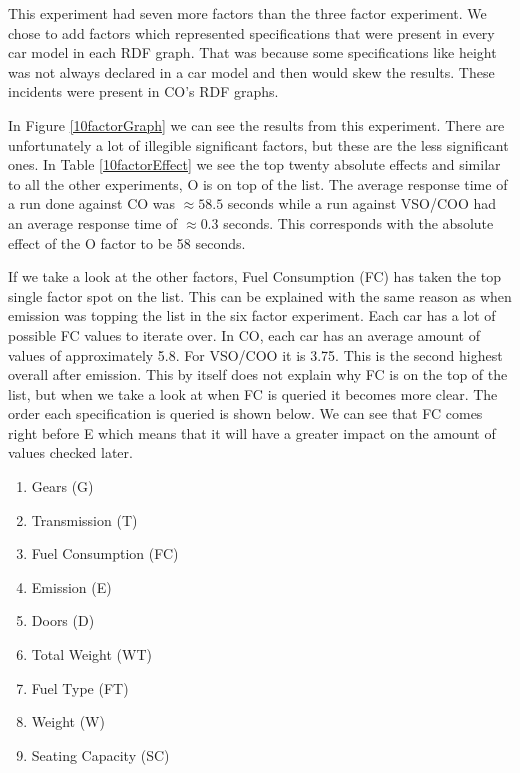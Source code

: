 \documentclass{llncs}
\begin{document}
This experiment had seven more factors than the three factor experiment.  We chose to add
factors which represented specifications that were present in every
car model in each RDF graph. That was because some specifications like
height was not always declared in a car model and then would skew the
results. These incidents were present in CO's RDF graphs.

In Figure \ref{10factorGraph} we can see the results from this
experiment. There are unfortunately a lot of illegible significant
factors, but these are the less significant ones. In Table
\ref{10factorEffect} we see the top twenty absolute effects and
similar to all the other experiments, O is on top of the list. The
average response time of a run done against CO was $\approx58.5$
seconds while a run against VSO/COO had an average response time of
$\approx0.3$ seconds.  This corresponds with the absolute effect of
the O factor to be 58 seconds.
 
If we take a look at the other factors, Fuel Consumption (FC) has
taken the top single factor spot on the list.  This can be explained
with the same reason as when emission was topping the list in the six
factor experiment. Each car has a lot of possible FC values to iterate
over. In CO, each car has an average amount of values of approximately
5.8. For VSO/COO it is 3.75.  This is the second highest overall after
emission. This by itself does not explain why FC is on the top of the
list, but when we take a look at when FC is queried it becomes more
clear. The order each specification is queried is shown below.  We can
see that FC comes right before E which means that it will have a
greater impact on the amount of values checked later.

 \begin{enumerate}
  
		\item Gears (G)
		\item Transmission (T)
		\item Fuel Consumption (FC)
		\item Emission (E)
		\item Doors (D)
		\item Total Weight (WT)
		\item Fuel Type (FT)
		\item Weight (W)
		\item Seating Capacity (SC)
\end{enumerate}
\end{document}
